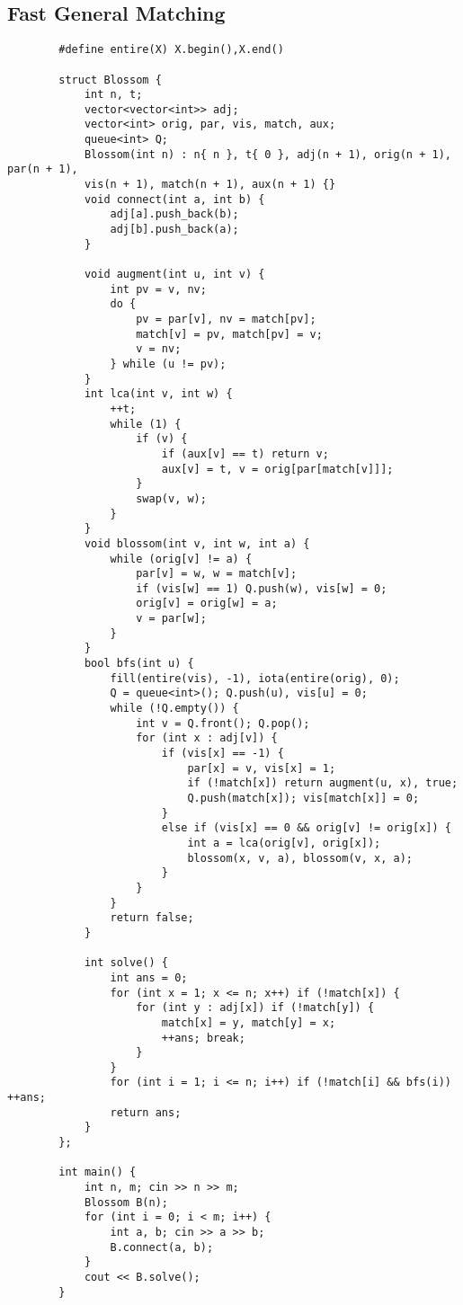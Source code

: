\documentclass[landscape, 8pt, a4paper, oneside, twocolumn]{extarticle}
\begin{document}
	\subsection {Fast General Matching}
	\begin{verbatim}
		#define entire(X) X.begin(),X.end()
		
		struct Blossom {
			int n, t;
			vector<vector<int>> adj;
			vector<int> orig, par, vis, match, aux;
			queue<int> Q;
			Blossom(int n) : n{ n }, t{ 0 }, adj(n + 1), orig(n + 1), par(n + 1),
			vis(n + 1), match(n + 1), aux(n + 1) {}
			void connect(int a, int b) {
				adj[a].push_back(b);
				adj[b].push_back(a);
			}
			
			void augment(int u, int v) {
				int pv = v, nv;
				do {
					pv = par[v], nv = match[pv];
					match[v] = pv, match[pv] = v;
					v = nv;
				} while (u != pv);
			}
			int lca(int v, int w) {
				++t;
				while (1) {
					if (v) {
						if (aux[v] == t) return v;
						aux[v] = t, v = orig[par[match[v]]];
					}
					swap(v, w);
				}
			}
			void blossom(int v, int w, int a) {
				while (orig[v] != a) {
					par[v] = w, w = match[v];
					if (vis[w] == 1) Q.push(w), vis[w] = 0;
					orig[v] = orig[w] = a;
					v = par[w];
				}
			}
			bool bfs(int u) {
				fill(entire(vis), -1), iota(entire(orig), 0);
				Q = queue<int>(); Q.push(u), vis[u] = 0;
				while (!Q.empty()) {
					int v = Q.front(); Q.pop();
					for (int x : adj[v]) {
						if (vis[x] == -1) {
							par[x] = v, vis[x] = 1;
							if (!match[x]) return augment(u, x), true;
							Q.push(match[x]); vis[match[x]] = 0;
						}
						else if (vis[x] == 0 && orig[v] != orig[x]) {
							int a = lca(orig[v], orig[x]);
							blossom(x, v, a), blossom(v, x, a);
						}
					}
				}
				return false;
			}
			
			int solve() {
				int ans = 0;
				for (int x = 1; x <= n; x++) if (!match[x]) {
					for (int y : adj[x]) if (!match[y]) {
						match[x] = y, match[y] = x;
						++ans; break;
					}
				}
				for (int i = 1; i <= n; i++) if (!match[i] && bfs(i)) ++ans;
				return ans;
			}
		};
		
		int main() {
			int n, m; cin >> n >> m;
			Blossom B(n);
			for (int i = 0; i < m; i++) {
				int a, b; cin >> a >> b;
				B.connect(a, b);
			}
			cout << B.solve();
		}
	\end{verbatim}
\end{document}
